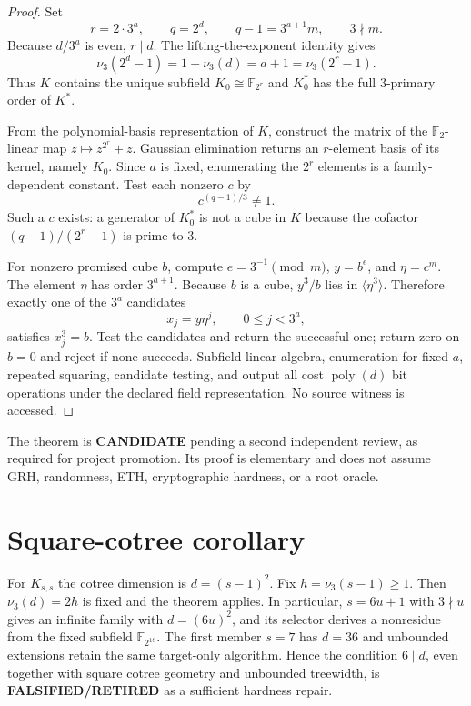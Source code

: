 \documentclass[11pt]{article}
\newcommand{\CAND}{\textbf{CANDIDATE}}
\newcommand{\RET}{\textbf{FALSIFIED/RETIRED}}
\begin{document}
\begin{proof}
Set
\[
 r=2\cdot3^a,\qquad q=2^d,
 \qquad q-1=3^{a+1}m,
 \qquad 3\nmid m.
\]
Because $d/3^a$ is even, $r\mid d$.  The lifting-the-exponent identity gives
\[
 \nu_3(2^d-1)=1+\nu_3(d)=a+1
 =\nu_3(2^r-1).
\]
Thus $K$ contains the unique subfield $K_0\cong\mathbb F_{2^r}$ and $K_0^*$
has the full $3$-primary order of $K^*$.

From the polynomial-basis representation of $K$, construct the matrix of the
$\mathbb F_2$-linear map $z\mapsto z^{2^r}+z$.  Gaussian elimination returns
an $r$-element basis of its kernel, namely $K_0$.  Since $a$ is fixed,
enumerating the $2^r$ elements is a family-dependent constant.  Test each
nonzero $c$ by
\[
 c^{(q-1)/3}\ne1.
\]
Such a $c$ exists: a generator of $K_0^*$ is not a cube in $K$ because the
cofactor $(q-1)/(2^r-1)$ is prime to $3$.

For nonzero promised cube $b$, compute $e=3^{-1}\pmod m$, $y=b^e$, and
$\eta=c^m$.  The element $\eta$ has order $3^{a+1}$.  Because $b$ is a cube,
$y^3/b$ lies in $\langle\eta^3\rangle$.  Therefore exactly one of the
$3^a$ candidates
\[
 x_j=y\eta^j,\qquad 0\le j<3^a,
\]
satisfies $x_j^3=b$.  Test the candidates and return the successful one;
return zero on $b=0$ and reject if none succeeds.  Subfield linear algebra,
enumeration for fixed $a$, repeated squaring, candidate testing, and output
all cost $\operatorname{poly}(d)$ bit operations under the declared field
representation.  No source witness is accessed.
\end{proof}

The theorem is \CAND{} pending a second independent review, as required for
project promotion.  Its proof is elementary and does not assume GRH,
randomness, ETH, cryptographic hardness, or a root oracle.

\section{Square-cotree corollary}
For $K_{s,s}$ the cotree dimension is $d=(s-1)^2$.  Fix
$h=\nu_3(s-1)\ge1$.  Then $\nu_3(d)=2h$ is fixed and the theorem applies.
In particular, $s=6u+1$ with $3\nmid u$ gives an infinite family with
$d=(6u)^2$, and its selector derives a nonresidue from the fixed subfield
$\mathbb F_{2^{18}}$.  The first member $s=7$ has $d=36$ and unbounded
extensions retain the same target-only algorithm.  Hence the condition
$6\mid d$, even together with square cotree geometry and unbounded
treewidth, is \RET{} as a sufficient hardness repair.
\end{document}
